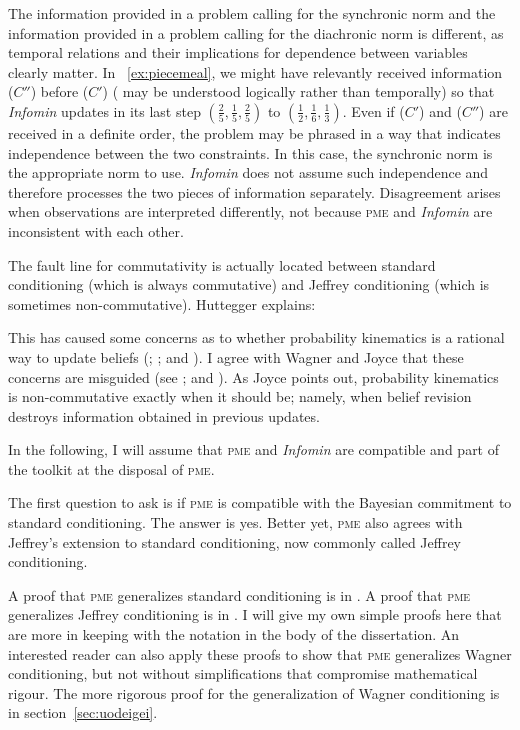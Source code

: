 \documentclass[phd,12pt,oneside]{ubcthesis}
\begin{document}
The information provided in a problem calling for the synchronic norm
and the information provided in a problem calling for the diachronic
norm is different, as temporal relations and their implications for
dependence between variables clearly matter. In
{\xample}~\ref{ex:piecemeal}, we might have relevantly received
information ($C''$) before ($C'$) ( may be understood
logically rather than temporally) so that \emph{Infomin} updates in
its last step $(\frac{2}{5},\frac{1}{5},\frac{2}{5})$ to
$(\frac{1}{2},\frac{1}{6},\frac{1}{3})$. Even if ($C'$) and ($C''$)
are received in a definite order, the problem may be phrased in a way
that indicates independence between the two constraints. In this case,
the synchronic norm is the appropriate norm to use. \emph{Infomin}
does not assume such independence and therefore processes the two
pieces of information separately. Disagreement arises when
observations are interpreted differently, not because \textsc{pme} and
\emph{Infomin} are inconsistent with each other. 

The fault line for commutativity is actually located between standard
conditioning (which is always commutative) and Jeffrey conditioning
(which is sometimes non-commutative). Huttegger explains:

\begin{quotex}
  This has caused some concerns as to whether probability kinematics
  is a rational way to update beliefs (;
  ; and ). I agree with Wagner
  and Joyce that these concerns are misguided (see
  ; and ). As Joyce points
  out, probability kinematics is non-commutative exactly when it
  should be; namely, when belief revision destroys information
  obtained in previous updates. 
\end{quotex}

{\noindent}In the following, I will assume that \textsc{pme} and
\emph{Infomin} are compatible and part of the toolkit at the disposal
of \textsc{pme}.

The first question to ask is if \textsc{pme} is compatible with the
Bayesian commitment to standard conditioning. The answer is yes.
Better yet, \textsc{pme} also agrees with Jeffrey's extension to
standard conditioning, now commonly called Jeffrey conditioning.

A proof that \textsc{pme} generalizes standard conditioning is in
. A proof that \textsc{pme} generalizes Jeffrey
conditioning is in . I will give my own simple
proofs here that are more in keeping with the notation in the body of
the dissertation. An interested reader can also apply these proofs to
show that \textsc{pme} generalizes Wagner conditioning, but not
without simplifications that compromise mathematical rigour. The more
rigorous proof for the generalization of Wagner conditioning is in
section~\ref{sec:uodeigei}.
\end{document}
